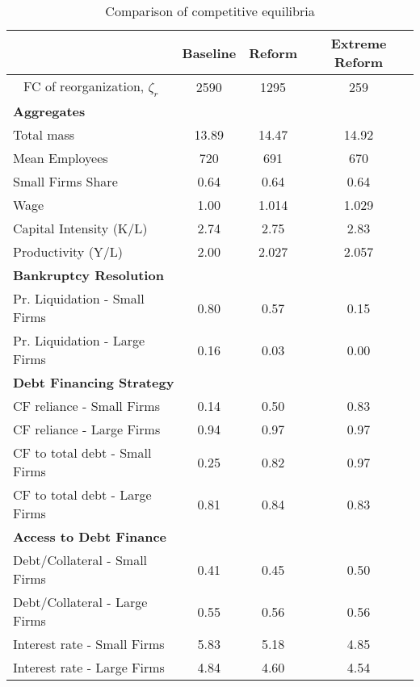\documentclass[12pt]{article}
\begin{document}
\begin{table}[H]
    \centering
    \begin{tabular}{lccc}
    & \textbf{Baseline} & \textbf{Reform} & \textbf{Extreme Reform} \\    
    \toprule
    \multicolumn{1}{c}{FC of reorganization, $\zeta_{r}$} & 2590 & 1295 & 259  \vspace{3mm} \\  
    \multicolumn{4}{l}{\textbf{Aggregates}} \\ \hline
    Total mass & 13.89 & 14.47 & 14.92  \\
    Mean Employees & 720 & 691 & 670  \\
    Small Firms Share  & 0.64 & 0.64 & 0.64  \\
    Wage & 1.00 & 1.014 & 1.029  \\
    Capital Intensity (K/L) & 2.74 & 2.75 & 2.83  \\
    Productivity (Y/L) & 2.00 & 2.027 & 2.057  \vspace{3mm} \\  
    \multicolumn{4}{l}{\textbf{Bankruptcy Resolution}} \\ \hline
    Pr. Liquidation - Small Firms & 0.80 & 0.57 & 0.15  \\
    Pr. Liquidation - Large Firms & 0.16 & 0.03 & 0.00  \vspace{3mm} \\  
    \multicolumn{4}{l}{\textbf{Debt Financing Strategy}} \\ \hline
    CF reliance - Small Firms & 0.14 & 0.50 & 0.83  \\
    CF reliance - Large Firms & 0.94 & 0.97 & 0.97  \vspace{1mm} \\  
    CF to total debt - Small Firms & 0.25 & 0.82 & 0.97  \\
    CF to total debt - Large Firms & 0.81 & 0.84 & 0.83  \vspace{3mm} \\  
    \multicolumn{4}{l}{\textbf{Access to Debt Finance}} \\ \hline
    Debt/Collateral - Small Firms & 0.41 & 0.45 & 0.50 \\
    Debt/Collateral - Large Firms & 0.55 & 0.56 & 0.56  \vspace{1mm} \\  
    Interest rate - Small Firms & 5.83 & 5.18 & 4.85  \\
    Interest rate - Large Firms & 4.84 & 4.60 & 4.54  \\  \bottomrule
    \end{tabular}
    \caption{Comparison of competitive equilibria}
    \label{tab:SSvalues}
\end{table}
\end{document}

